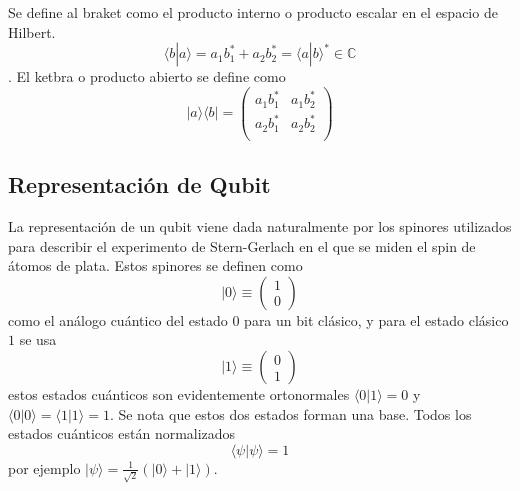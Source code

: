 \documentclass[a4paper]{article}
\begin{document}
Se define al braket como el producto interno o producto escalar en el espacio de Hilbert.
\begin{equation}
\langle b | a\rangle=a_1b_1^*+a_2b_2^*=\langle a | b\rangle^*\in \mathbb{C}
\end{equation}.
El ketbra o producto abierto se define como 
\begin{equation}
|a\rangle\langle b|=
	\begin{pmatrix}
		a_1 b_1^*& a_1 b_2^*\\
		a_2 b_1^*& a_2 b_2^*\\
	\end{pmatrix}
\end{equation}
\subsection{Representación de Qubit}
La representación de un qubit viene dada naturalmente por los spinores utilizados para describir el experimento de Stern-Gerlach en el que se miden el spin de átomos de plata. Estos spinores se definen como 
\begin{equation}\label{eq::qubit0}
|0\rangle\equiv
\begin{pmatrix}
		1\\
		0
	\end{pmatrix}
\end{equation}
como el análogo cuántico del estado $0$ para un bit clásico, y para el estado clásico $1$ se usa
\begin{equation}\label{eq::qubit1}
|1\rangle\equiv
\begin{pmatrix}
		0\\
		1
	\end{pmatrix}
\end{equation}
estos estados cuánticos son evidentemente ortonormales $\langle 0 | 1\rangle=0$ y $\langle 0 | 0\rangle=\langle 1 | 1\rangle=1$. Se nota que estos dos estados forman una base. Todos los estados cuánticos están normalizados
\begin{equation}
\langle \psi | \psi\rangle=1
\end{equation}
por ejemplo $|\psi\rangle=\frac{1}{\sqrt{2}}(|0\rangle+|1\rangle)$.
\end{document}
